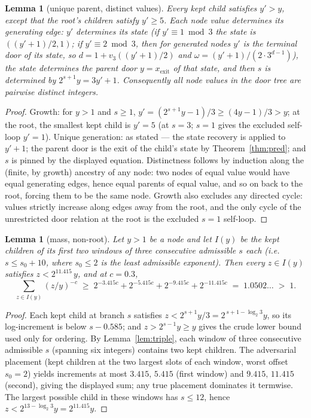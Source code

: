 \documentclass[11pt]{article}
\newtheorem{lemma}[theorem]{Lemma}
\theoremstyle{remark}
\newcommand{\vth}[1]{v_3\!\left(#1\right)}
\newcommand{\w}{\omega}
\newcommand{\LL}{\log_2 3}
\begin{document}
\begin{lemma}[unique parent, distinct values]\label{lem:distinct}
Every kept child satisfies $y' > y$, except that the root's children satisfy $y' \ge 5$. Each node value determines its generating edge: $y'$ determines its state (if $y' \equiv 1 \bmod 3$ the state is $((y'+1)/2, 1)$; if $y' \equiv 2 \bmod 3$, then for generated nodes $y'$ is the terminal door of its state, so $d = 1 + \vth{(y'+1)/2}$ and $\w = (y'+1)/(2\cdot3^{d-1})$), the state determines the parent door $y = x_{\mathrm{exit}}$ of that state, and then $s$ is determined by $2^{s+1}y = 3y' + 1$. Consequently all node values in the door tree are pairwise distinct integers.
\end{lemma}

\begin{proof}
Growth: for $y > 1$ and $s \ge 1$, $y' = (2^{s+1}y - 1)/3 \ge (4y-1)/3 > y$; at the root, the smallest kept child is $y' = 5$ (at $s = 3$; $s = 1$ gives the excluded self-loop $y' = 1$). Unique generation: as stated --- the state recovery is \cite[\S2]{paper1} applied to $y' + 1$; the parent door is the exit of the child's state by Theorem~\ref{thm:pred}; and $s$ is pinned by the displayed equation. Distinctness follows by induction along the (finite, by growth) ancestry of any node: two nodes of equal value would have equal generating edges, hence equal parents of equal value, and so on back to the root, forcing them to be the same node. Growth also excludes any directed cycle: values strictly increase along edges away from the root, and the only cycle of the unrestricted door relation at the root is the excluded $s{=}1$ self-loop.
\end{proof}

\begin{lemma}[mass, non-root]\label{lem:mass}
Let $y > 1$ be a node and let $I(y)$ be the kept children of its first two windows of three consecutive admissible $s$ each (i.e.\ $s \le s_0 + 10$, where $s_0 \le 2$ is the least admissible exponent). Then every $z \in I(y)$ satisfies $z < 2^{11.415}\,y$, and at $c = 0.3$,
\[ \sum_{z \in I(y)} (z/y)^{-c} \;\ge\; 2^{-3.415c} + 2^{-5.415c} + 2^{-9.415c} + 2^{-11.415c} \;=\; 1.0502\ldots \;>\; 1. \]
\end{lemma}

\begin{proof}
Each kept child at branch $s$ satisfies $z < 2^{s+1}y/3 = 2^{\,s+1-\LL}y$, so its log-increment is below $s - 0.585$; and $z > 2^{s-1}y \ge y$ gives the crude lower bound used only for ordering. By Lemma~\ref{lem:triple}, each window of three consecutive admissible $s$ (spanning six integers) contains two kept children. The adversarial placement (kept children at the two largest slots of each window, worst offset $s_0 = 2$) yields increments at most $3.415,\,5.415$ (first window) and $9.415,\,11.415$ (second), giving the displayed sum; any true placement dominates it termwise. The largest possible child in these windows has $s \le 12$, hence $z < 2^{13 - \LL}y = 2^{11.415}y$.
\end{proof}
\end{document}
